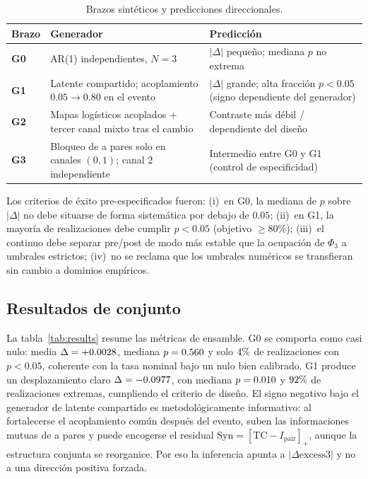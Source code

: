 \documentclass[11pt,a4paper]{article}
\begin{document}
\begin{table}[H]
\centering
\caption{Brazos sint\'eticos y predicciones direccionales.}
\label{tab:arms}
\small
\begin{tabularx}{\textwidth}{@{}>{\raggedright\arraybackslash}p{1.2cm}
  >{\raggedright\arraybackslash}X
  >{\raggedright\arraybackslash}X@{}}
\toprule
Brazo & Generador & Predicci\'on \\
\midrule
\textbf{G0}
  & AR(1) independientes, $N=3$
  & $|\Delta|$ peque\~no; mediana $p$ no extrema \\
\textbf{G1}
  & Latente compartido; acoplamiento $0.05\to 0.80$ en el evento
  & $|\Delta|$ grande; alta fracci\'on $p<0.05$ (signo dependiente del generador) \\
\textbf{G2}
  & Mapas log\'isticos acoplados $+$ tercer canal mixto tras el cambio
  & Contraste m\'as d\'ebil / dependiente del dise\~no \\
\textbf{G3}
  & Bloqueo de a pares solo en canales $(0,1)$; canal 2 independiente
  & Intermedio entre G0 y G1 (control de especificidad) \\
\bottomrule
\end{tabularx}
\end{table}

Los criterios de \'exito pre-especificados fueron: (i)~en G0, la mediana de
$p$ sobre $|\Delta|$ no debe situarse de forma sistem\'atica por debajo de
$0.05$; (ii)~en G1, la mayor\'ia de realizaciones debe cumplir $p<0.05$
(objetivo $\ge 80\%$); (iii)~el continuo debe separar pre/post de modo m\'as
estable que la ocupaci\'on de $\Phi_3$ a umbrales estrictos; (iv)~no se
reclama que los umbrales num\'ericos se transfieran sin cambio a dominios
emp\'iricos.

\subsection{Resultados de conjunto}

La tabla~\ref{tab:results} resume las m\'etricas de ensamble. G0 se comporta
como casi nulo: media $\Delta=+0.0028$, mediana $p=0.560$ y solo
$4\%$ de realizaciones con $p<0.05$, coherente con la tasa nominal
bajo un nulo bien calibrado. G1 produce un desplazamiento claro
$\Delta=-0.0977$, con mediana $p=0.010$ y $92\%$ de
realizaciones extremas, cumpliendo el criterio de dise\~no. El signo
negativo bajo el generador de latente compartido es metodol\'ogicamente
informativo: al fortalecerse el acoplamiento com\'un despu\'es del evento,
suben las informaciones mutuas de a pares y puede encogerse el residual
$\mathrm{Syn}=[\mathrm{TC}-I_{\mathrm{pair}}]_+$, aunque la estructura
conjunta se reorganice. Por eso la inferencia apunta a
$|\Delta\mathrm{excess3}|$ y no a una direcci\'on positiva forzada.
\end{document}
